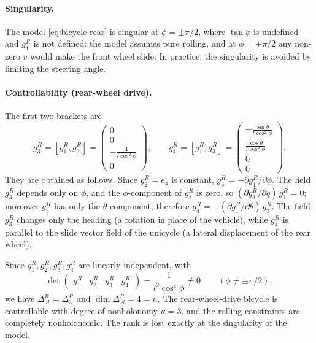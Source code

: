 \paragraph{Singularity.}
The model \cref{eq:bicycle-rear} is singular at \( \phi = \pm\pi/2 \),
where \( \tan\phi \) is undefined and \( g_1^R \) is not defined: the
model assumes pure rolling, and at \( \phi = \pm\pi/2 \) any non-zero
\( v \) would make the front wheel slide. In practice, the singularity
is avoided by limiting the steering angle.

\paragraph{Controllability (rear-wheel drive).}
The first two brackets are
\[
g_3^R = [g_1^R, g_2^R] =
\begin{pmatrix} 0 \\ 0 \\ -\frac{1}{l\cos^2\phi} \\ 0 \end{pmatrix},
\qquad
g_4^R = [g_1^R, g_3^R] =
\begin{pmatrix}
    -\frac{\sin\theta}{l\cos^2\phi} \\
    \frac{\cos\theta}{l\cos^2\phi} \\ 0 \\ 0
\end{pmatrix}.
\]
They are obtained as follows. Since \( g_2^R = e_4 \) is constant,
\( g_3^R = -\partial g_1^R / \partial \phi \). The field \( g_3^R \)
depends only on \( \phi \), and the \( \phi \)-component of
\( g_1^R \) is zero, so \( (\partial g_3^R/\partial q)\, g_1^R = 0 \);
moreover \( g_3^R \) has only the \( \theta \)-component, therefore
\( g_4^R = -(\partial g_1^R/\partial\theta)\, g_3^R \). The field
\( g_3^R \) changes only the heading (a rotation in place of the
vehicle), while \( g_4^R \) is parallel to the slide vector field of
the unicycle (a lateral displacement of the rear wheel).

Since \( g_1^R, g_2^R, g_3^R, g_4^R \) are linearly independent, with
\[
\det \begin{pmatrix} g_1^R & g_2^R & g_3^R & g_4^R \end{pmatrix}
= \frac{1}{l^2\cos^4\phi} \neq 0 \qquad (\phi \neq \pm\pi/2),
\]
we have \( \Delta_{\mathcal{A}}^R = \Delta_3^R \) and
\( \dim \Delta_{\mathcal{A}}^R = 4 = n \). The rear-wheel-drive bicycle
is controllable with degree of nonholonomy \( \kappa = 3 \), and the
rolling constraints are completely nonholonomic. The rank is lost
exactly at the singularity of the model.

